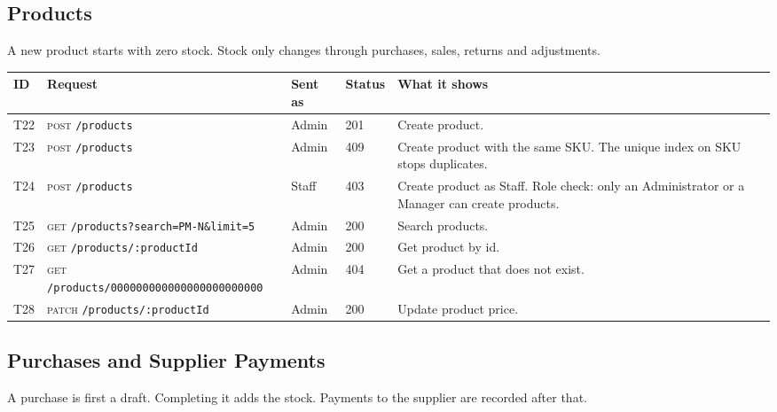 \documentclass[11pt,a4paper]{article}
\newcommand{\code}[1]{\texttt{#1}}
\begin{document}
\subsection{Products}
A new product starts with zero stock. Stock only changes through purchases, sales, returns and adjustments.

\begin{longtable}{@{}P{0.7cm}P{5.0cm}P{1.3cm}P{1.15cm}P{5.75cm}@{}}
\toprule
\textbf{ID} & \textbf{Request} & \textbf{Sent as} & \textbf{Status} & \textbf{What it shows} \\
\midrule
\endhead
T22 & \textsc{post} \code{/\allowbreak{}products} & Admin & 201 & Create product. \\
T23 & \textsc{post} \code{/\allowbreak{}products} & Admin & 409 & Create product with the same SKU. The unique index on SKU stops duplicates. \\
T24 & \textsc{post} \code{/\allowbreak{}products} & Staff & 403 & Create product as Staff. Role check: only an Administrator or a Manager can create products. \\
T25 & \textsc{get} \code{/\allowbreak{}products?\allowbreak{}search=\allowbreak{}PM-N\&\allowbreak{}limit=\allowbreak{}5} & Admin & 200 & Search products. \\
T26 & \textsc{get} \code{/\allowbreak{}products/\allowbreak{}:productId} & Admin & 200 & Get product by id. \\
T27 & \textsc{get} \code{/\allowbreak{}products/\allowbreak{}000000000000000000000000} & Admin & 404 & Get a product that does not exist. \\
T28 & \textsc{patch} \code{/\allowbreak{}products/\allowbreak{}:productId} & Admin & 200 & Update product price. \\
\bottomrule
\end{longtable}

\subsection{Purchases and Supplier Payments}
A purchase is first a draft. Completing it adds the stock. Payments to the supplier are recorded after that.
\end{document}
